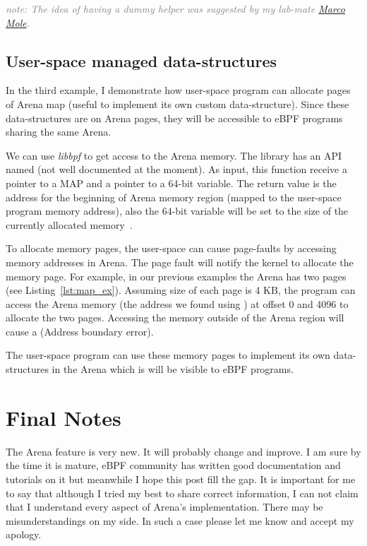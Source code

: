\documentclass{article} \usepackage{graphicx}
\begin{document}
\textcolor{gray}{\textit{note: The idea of having a dummy helper was suggested
by my lab-mate \href{https://marcomole00.github.io/}{Marco Mole}.}}


\subsection{User-space managed data-structures}

In the third example, I demonstrate how user-space program can allocate pages
of Arena map (useful to implement its own custom data-structure). Since these
data-structures are on Arena pages, they will be accessible to eBPF programs
sharing the same Arena.

We can use \emph{libbpf} to get access to the Arena memory.
The library has an API named  (not well documented
at the moment). As input, this function receive a pointer to a MAP and a pointer
to a 64-bit variable. The return value is the address for the beginning of Arena
memory region (mapped to the user-space program memory address), also the
64-bit variable will be set to the size of the currently allocated
memory~\cite{libbpf_initial_value}.

To allocate memory pages, the user-space can cause page-faults by accessing
memory addresses in Arena. The page fault will notify the kernel to allocate
the memory page. For example, in our previous examples the Arena has two pages
(see Listing~\ref{lst:map_ex}). Assuming size of each page is 4 KB, the program
can access the Arena memory (the address we found using
) at offset 0 and 4096 to allocate the two pages.
Accessing the memory outside of the Arena region will cause a 
(Address boundary error).

The user-space program can use these memory pages to implement its own
data-structures in the Arena which is will be visible to eBPF programs.


\section{Final Notes}

The Arena feature is very new. It will probably change and improve. I am sure
by the time it is mature, eBPF community has written good documentation and
tutorials on it but meanwhile I hope this post fill the gap. It is important
for me to say that although I tried my best to share correct information, I can
not claim that I understand every aspect of Arena's implementation. There may
be misunderstandings on my side. In such a case please let me know and accept
my apology.
\end{document}
